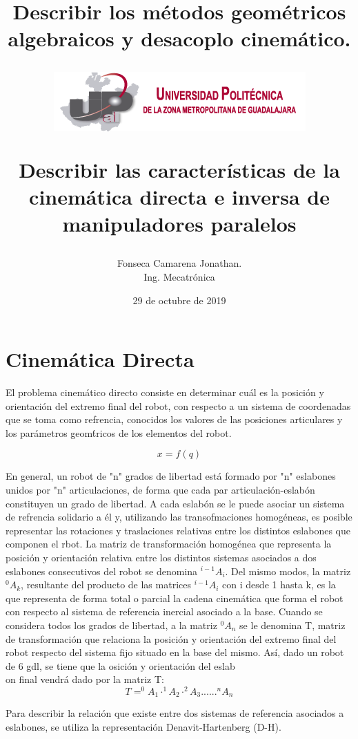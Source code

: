 \documentclass[letter,openright,12pt,spanish]{report}
\title{\textbf{Describir los métodos geométricos algebraicos y desacoplo cinemático.}}
\title{\begin{center}
\includegraphics[scale=1.5]{Escudo.png} 
\end{center}Describir las características de la cinemática directa e inversa de manipuladores paralelos}
\author{Fonseca Camarena Jonathan.\\
		Ing. Mecatr\'onica}
\date{29 de octubre de 2019}
\begin{document}
\maketitle

\section{Cinem\'atica Directa}

El problema cinem\'atico directo consiste en determinar cu\'al es la posici\'on y orientaci\'on del extremo final del robot, con respecto a un sistema de coordenadas que se toma como refrencia, conocidos los valores de las posiciones articulares y los par\'ametros geom\'tricos de los elementos del robot. 

\begin{displaymath}
x=\textit{f}(q)
\end{displaymath}

En general, un robot de "n" grados de libertad est\'a formado por "n" eslabones unidos por "n" articulaciones, de forma que cada par articulaci\'on-eslab\'on constituyen un grado de libertad. A cada eslab\'on se le puede asociar un sistema de refrencia solidario a \'el y, utilizando las transofmaciones homog\'eneas, es posible representar las rotaciones y traslaciones relativas entre los distintos eslabones que componen el rbot. La matriz de transformaci\'on homog\'enea que representa la posici\'on y orientaci\'on relativa entre los distintos sistemas asociados a dos eslabones consecutivos del robot se denomina $^{i-1}A_i$. Del mismo modos, la matriz $^0A_k$, resultante del producto de las matrices $^{i-1}A_i$ con i desde 1 hasta k, es la que representa de forma total o parcial la cadena cinem\'atica que forma el robot con respecto al sistema de referencia inercial asociado a la base. Cuando se considera todos los grados de libertad, a la matriz $^0A_n$ se le denomina T, matriz de transformaci\'on que relaciona la posici\'on y orientaci\'on del extremo final del robot respecto del sistema fijo situado en la base del mismo. As\'i, dado un robot de 6 gdl, se tiene que la osici\'on y orientaci\'on del eslab\\on final vendr\'a dado por la matriz T:\\

\begin{displaymath}
T=^0A_1 \cdot ^1A_2 \cdot ^2A_3... ... ^nA_n
\end{displaymath} 

Para describir la relaci\'on que existe entre dos sistemas de referencia asociados a eslabones, se utiliza la representaci\'on Denavit-Hartenberg (D-H). 
\end{document}
